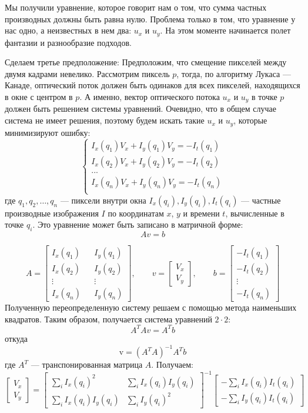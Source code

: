 Мы получили уравнение, которое говорит нам о том, что сумма частных производных должны быть равна нулю. Проблема только в том, что уравнение у нас одно, а неизвестных в нем два: $u_x$ и $u_y$. На этом моменте начинается полет фантазии и разнообразие подходов.

Сделаем третье предположение: Предположим, что смещение пикселей между двумя кадрами невелико. Рассмотрим пиксель $p$, тогда, по алгоритму Лукаса — Канаде, оптический поток должен быть одинаков для всех пикселей, находящихся в окне с центром в $p$. А именно, вектор оптического потока $u_x$ и $u_y$ в точке $p$ должен быть решением системы уравнений. Очевидно, что в общем случае система не имеет решения, поэтому будем искать такие $u_x$ и $u_y$, которые минимизируют ошибку:
$$
\begin{cases}
I_x(q_1) V_x + I_y (q_1) V_y = -I_t(q_1)\\
I_x(q_2) V_x + I_y (q_2) V_y = -I_t(q_2)\\
...\\
I_x(q_n) V_x + I_y (q_n) V_y = -I_t(q_n)\\
\end{cases}
$$
где $q_1,q_2,\dots,q_n$ — пиксели внутри окна
$I_x(q_i),I_y(q_i),I_t(q_i)$ — частные производные изображения $I$ по координатам $x$, $y$ и времени $t$, вычисленные в точке $q_i$.
Это уравнение может быть записано в матричной форме:
$$A v = b$$

$$A = \begin{bmatrix}
I_x(q_1) && I_y(q_1) \\
I_x(q_2) && I_y(q_2) \\
\vdots  && \vdots  \\
I_x(q_n) && I_y(q_n)
\end{bmatrix},
\quad\quad
v =
\begin{bmatrix}
V_x\\
V_y
\end{bmatrix},
\quad\quad
b =
\begin{bmatrix}
-I_t(q_1)\\
-I_t(q_2)\\
\vdots \\
-I_t(q_n)
\end{bmatrix} $$
Полученную переопределенную систему решаем с помощью метода наименьших квадратов. Таким образом, получается система уравнений $2 \cdot 2$:
$$A^T A v=A^T b$$
откуда
$$\mathrm{v}=(A^T A)^{-1}A^T b$$
где $A^T$ — транспонированная матрица $A$. Получаем:
$$\begin{bmatrix} V_x\\[10pt] V_y \end{bmatrix} = \begin{bmatrix} \sum_i I_x(q_i)^2 & \sum_i I_x(q_i)I_y(q_i) \\[10pt] \sum_i I_x(q_i)I_y(q_i) & \sum_i I_y(q_i)^2 \end{bmatrix}^{-1} \begin{bmatrix} -\sum_i I_x(q_i)I_t(q_i) \\[10pt] -\sum_i I_y(q_i)I_t(q_i) \end{bmatrix}$$


